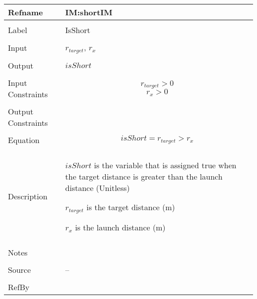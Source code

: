\documentclass[12pt]{article}
\begin{document}
\noindent \begin{minipage}{\textwidth}
\begin{tabular}{p{} p{}}
\toprule \textbf{Refname} & \textbf{IM:shortIM}
\label{IM:shortIM}
\\ \midrule \\
Label & IsShort
\\ \midrule \\
Input & ${r_{target}}$, ${r_{x}}$
\\ \midrule \\
Output & $isShort$
\\ \midrule \\
Input Constraints & \begin{displaymath}
                    {r_{target}}>0
                    \end{displaymath}
                    \begin{displaymath}
                    {r_{x}}>0
                    \end{displaymath}
\\ \midrule \\
Output Constraints & 
\\ \midrule \\
Equation & \begin{displaymath}
           isShort={r_{target}}>{r_{x}}
           \end{displaymath}
\\ \midrule \\
Description & \begin{symbDescription}
              \item{$isShort$ is the variable that is assigned true when the target distance is greater than the launch distance (Unitless)}
              \item{${r_{target}}$ is the target distance (m)}
              \item{${r_{x}}$ is the launch distance (m)}
              \end{symbDescription}
\\ \midrule \\
Notes & 
\\ \midrule \\
Source & --
\\ \midrule \\
RefBy & 
\\ \bottomrule \end{tabular}
\end{minipage}
\par~
\end{document}
